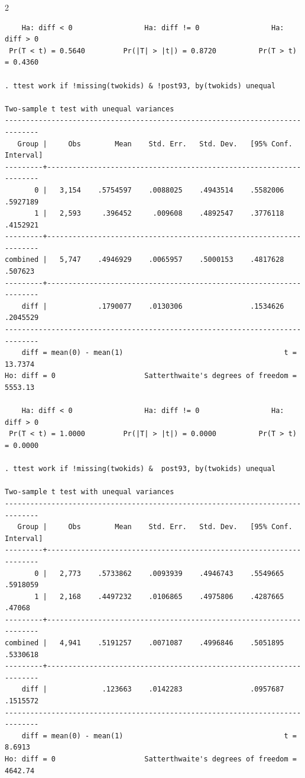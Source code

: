 \documentclass{article}
\newenvironment{changemargin}[2]{%
\begin{list}{}{%
\setlength{\topsep}{0pt}%
\setlength{\leftmargin}{#1}%
\setlength{\rightmargin}{#2}%
\setlength{\listparindent}{\parindent}%
\setlength{\itemindent}{\parindent}%
\setlength{\parsep}{\parskip}%
}%
\item[]}{\end{list}}
\begin{document}
\begin{changemargin}{-0.5in}{-0.5in}
\begin{multicols}{2}
\begin{verbatim}
    Ha: diff < 0                 Ha: diff != 0                 Ha: diff > 0
 Pr(T < t) = 0.5640         Pr(|T| > |t|) = 0.8720          Pr(T > t) = 0.4360

. ttest work if !missing(twokids) & !post93, by(twokids) unequal

Two-sample t test with unequal variances
------------------------------------------------------------------------------
   Group |     Obs        Mean    Std. Err.   Std. Dev.   [95% Conf. Interval]
---------+--------------------------------------------------------------------
       0 |   3,154    .5754597    .0088025    .4943514    .5582006    .5927189
       1 |   2,593     .396452     .009608    .4892547    .3776118    .4152921
---------+--------------------------------------------------------------------
combined |   5,747    .4946929    .0065957    .5000153    .4817628     .507623
---------+--------------------------------------------------------------------
    diff |            .1790077    .0130306                .1534626    .2045529
------------------------------------------------------------------------------
    diff = mean(0) - mean(1)                                      t =  13.7374
Ho: diff = 0                     Satterthwaite's degrees of freedom =  5553.13

    Ha: diff < 0                 Ha: diff != 0                 Ha: diff > 0
 Pr(T < t) = 1.0000         Pr(|T| > |t|) = 0.0000          Pr(T > t) = 0.0000

. ttest work if !missing(twokids) &  post93, by(twokids) unequal

Two-sample t test with unequal variances
------------------------------------------------------------------------------
   Group |     Obs        Mean    Std. Err.   Std. Dev.   [95% Conf. Interval]
---------+--------------------------------------------------------------------
       0 |   2,773    .5733862    .0093939    .4946743    .5549665    .5918059
       1 |   2,168    .4497232    .0106865    .4975806    .4287665      .47068
---------+--------------------------------------------------------------------
combined |   4,941    .5191257    .0071087    .4996846    .5051895    .5330618
---------+--------------------------------------------------------------------
    diff |             .123663    .0142283                .0957687    .1515572
------------------------------------------------------------------------------
    diff = mean(0) - mean(1)                                      t =   8.6913
Ho: diff = 0                     Satterthwaite's degrees of freedom =  4642.74


\end{verbatim}
\end{multicols}
\end{changemargin}
\end{document}
